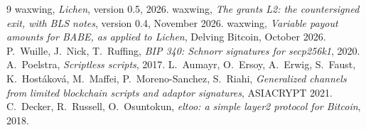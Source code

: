 \documentclass[11pt]{article}
\theoremstyle{plain}
\theoremstyle{definition}
\begin{document}
\begin{thebibliography}{9}
 waxwing, \emph{Lichen}, version 0.5, 2026.
 waxwing, \emph{The grants L2: the countersigned exit,
  with BLS notes}, version 0.4, November 2026.
 waxwing, \emph{Variable payout amounts for BABE, as
  applied to Lichen}, Delving Bitcoin, October 2026.
 P.~Wuille, J.~Nick, T.~Ruffing, \emph{BIP 340: Schnorr
  signatures for secp256k1}, 2020.
 A.~Poelstra, \emph{Scriptless scripts}, 2017.
 L.~Aumayr, O.~Ersoy, A.~Erwig, S.~Faust,
  K.~Hostáková, M.~Maffei, P.~Moreno-Sanchez, S.~Riahi,
  \emph{Generalized channels from limited blockchain scripts and
  adaptor signatures}, ASIACRYPT 2021.
 C.~Decker, R.~Russell, O.~Osuntokun, \emph{eltoo: a
  simple layer2 protocol for Bitcoin}, 2018.
\end{thebibliography}
\end{document}
